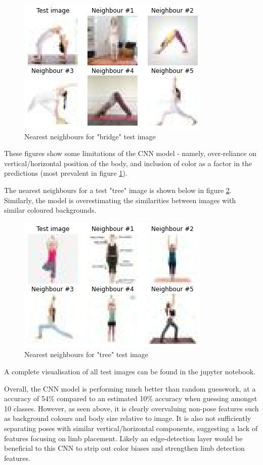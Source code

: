 \documentclass[10pt,a4paper]{article}
\begin{document}
\begin{figure}[H]
	\centering
	\includegraphics[width=0.7\linewidth]{images/vis_bridge_2}
	\caption{Nearest neighbours for "bridge" test image}
	\label{fig:vis_bridge_2}
\end{figure}

These figures show some limitations of the CNN model - namely, over-reliance on vertical/horizontal position of the body, and inclusion of color as a factor in the predictions (most prevalent in figure \ref{fig:vis_bridge_2}).

The nearest neighbours for a test "tree" image is shown below in figure \ref{fig:vis_tree}. Similarly, the model is overestimating the similarities between images with similar coloured backgrounds. 

\begin{figure}[H]
	\centering
	\includegraphics[width=0.7\linewidth]{images/vis_tree}
	\caption{Nearest neighbours for "tree" test image}
	\label{fig:vis_tree}
\end{figure}

A complete visualisation of all test images can be found in the jupyter notebook.

Overall, the CNN model is performing much better than random guesswork, at a accuracy of 54\% compared to an estimated 10\% accuracy when guessing amongst 10 classes. However, as seen above, it is clearly overvaluing non-pose features such as background colours and body size relative to image. It is also not sufficiently separating poses with similar vertical/horizontal components, suggesting a lack of features focusing on limb placement. Likely an edge-detection layer would be beneficial to this CNN to strip out color biases and strengthen limb detection features.
\end{document}
